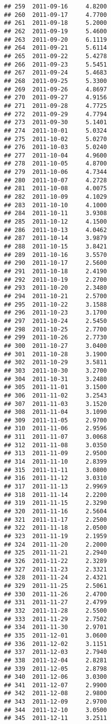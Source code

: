 \documentclass[
]{article}
\begin{document}
\begin{verbatim}
## 259  2011-09-16     4.8200
## 260  2011-09-17     4.7700
## 261  2011-09-18     5.2000
## 262  2011-09-19     5.4600
## 263  2011-09-20     6.1119
## 264  2011-09-21     5.6114
## 265  2011-09-22     5.4278
## 266  2011-09-23     5.5451
## 267  2011-09-24     5.4683
## 268  2011-09-25     5.3300
## 269  2011-09-26     4.8697
## 270  2011-09-27     4.9156
## 271  2011-09-28     4.7725
## 272  2011-09-29     4.7794
## 273  2011-09-30     5.1401
## 274  2011-10-01     5.0324
## 275  2011-10-02     5.0270
## 276  2011-10-03     5.0240
## 277  2011-10-04     4.9600
## 278  2011-10-05     4.8700
## 279  2011-10-06     4.7344
## 280  2011-10-07     4.2728
## 281  2011-10-08     4.0075
## 282  2011-10-09     4.1029
## 283  2011-10-10     4.1000
## 284  2011-10-11     3.9308
## 285  2011-10-12     4.1500
## 286  2011-10-13     4.0462
## 287  2011-10-14     3.9879
## 288  2011-10-15     3.8421
## 289  2011-10-16     3.5570
## 290  2011-10-17     2.5600
## 291  2011-10-18     2.4190
## 292  2011-10-19     2.2700
## 293  2011-10-20     2.3480
## 294  2011-10-21     2.5700
## 295  2011-10-22     3.1588
## 296  2011-10-23     3.1700
## 297  2011-10-24     2.5450
## 298  2011-10-25     2.7700
## 299  2011-10-26     2.7730
## 300  2011-10-27     3.0400
## 301  2011-10-28     3.1900
## 302  2011-10-29     3.5811
## 303  2011-10-30     3.2700
## 304  2011-10-31     3.2480
## 305  2011-11-01     3.1500
## 306  2011-11-02     3.2543
## 307  2011-11-03     3.1520
## 308  2011-11-04     3.1090
## 309  2011-11-05     2.9700
## 310  2011-11-06     2.9596
## 311  2011-11-07     3.0068
## 312  2011-11-08     3.0350
## 313  2011-11-09     2.9500
## 314  2011-11-10     2.8399
## 315  2011-11-11     3.0800
## 316  2011-11-12     3.0310
## 317  2011-11-13     2.9969
## 318  2011-11-14     2.2200
## 319  2011-11-15     2.3290
## 320  2011-11-16     2.5604
## 321  2011-11-17     2.2500
## 322  2011-11-18     2.0500
## 323  2011-11-19     2.1959
## 324  2011-11-20     2.2000
## 325  2011-11-21     2.2940
## 326  2011-11-22     2.3289
## 327  2011-11-23     2.3321
## 328  2011-11-24     2.4321
## 329  2011-11-25     2.5061
## 330  2011-11-26     2.4700
## 331  2011-11-27     2.4799
## 332  2011-11-28     2.5500
## 333  2011-11-29     2.7502
## 334  2011-11-30     2.9701
## 335  2011-12-01     3.0600
## 336  2011-12-02     3.1151
## 337  2011-12-03     2.7940
## 338  2011-12-04     2.8281
## 339  2011-12-05     2.8798
## 340  2011-12-06     3.0300
## 341  2011-12-07     2.9900
## 342  2011-12-08     2.9800
## 343  2011-12-09     2.9700
## 344  2011-12-10     3.0500
## 345  2011-12-11     3.2511

\end{verbatim}
\end{document}
